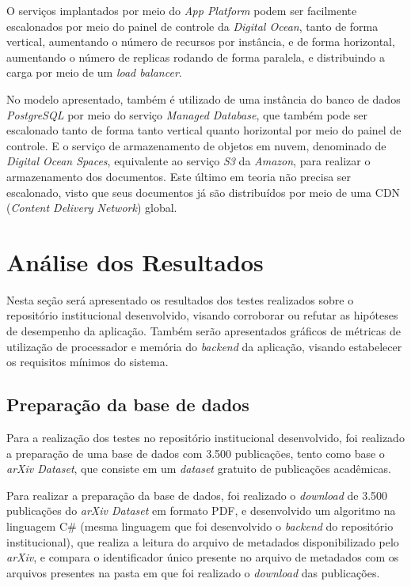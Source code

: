 O serviços implantados por meio do \emph{App Platform} podem ser facilmente escalonados
por meio do painel de controle da \emph{Digital Ocean}, tanto de forma vertical,
aumentando o número de recursos por instância, e de forma horizontal, aumentando o
número de replicas rodando de forma paralela, e distribuindo a carga por meio de um
\emph{load balancer}.

No modelo apresentado, também é utilizado de uma instância do banco de dados
\emph{PostgreSQL} por meio do serviço \emph{Managed Database}, que também
pode ser escalonado tanto de forma tanto vertical quanto horizontal por meio do painel
de controle. E o serviço de armazenamento de objetos em nuvem, denominado de
\emph{Digital Ocean Spaces}, equivalente ao serviço \emph{S3} da \emph{Amazon},
para realizar o armazenamento dos documentos. Este último em teoria não precisa
ser escalonado, visto que seus documentos já são distribuídos por meio de uma
CDN (\emph{Content Delivery Network}) global.


\section{Análise dos Resultados}

Nesta seção será apresentado os resultados dos testes realizados
sobre o repositório institucional desenvolvido, visando corroborar ou refutar
as hipóteses de desempenho da aplicação. Também serão apresentados gráficos de
métricas de utilização de processador e memória do \emph{backend} da aplicação,
visando estabelecer os requisitos mínimos do sistema.

\subsection{Preparação da base de dados}

Para a realização dos testes no repositório institucional desenvolvido,
foi realizado a preparação de uma base de dados com 3.500 publicações,
tento como base o \emph{arXiv Dataset}, que consiste em um \emph{dataset}
gratuito de publicações acadêmicas.

Para realizar a preparação da base de dados, foi realizado o \emph{download} de
3.500 publicações do \emph{arXiv Dataset} em formato PDF, e desenvolvido um algoritmo
na linguagem C\# (mesma linguagem que foi desenvolvido o \emph{backend} do repositório
institucional), que realiza a leitura do arquivo de metadados disponibilizado pelo \emph{arXiv},
e compara o identificador único presente no arquivo de metadados com os arquivos presentes
na pasta em que foi realizado o \emph{download} das publicações.

